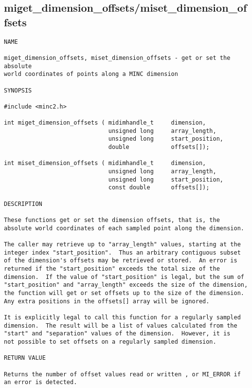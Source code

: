 \documentclass{article}
\begin{document}
\subsection{miget\_dimension\_offsets/miset\_dimension\_offsets}
\begin{verbatim}
NAME

miget_dimension_offsets, miset_dimension_offsets - get or set the absolute
world coordinates of points along a MINC dimension

SYNOPSIS

#include <minc2.h>

int miget_dimension_offsets ( midimhandle_t     dimension, 
                              unsigned long     array_length, 
                              unsigned long     start_position,
                              double            offsets[]);

int miset_dimension_offsets ( midimhandle_t     dimension, 
                              unsigned long     array_length, 
                              unsigned long     start_position,
                              const double      offsets[]);

DESCRIPTION

These functions get or set the dimension offsets, that is, the
absolute world coordinates of each sampled point along the dimension.

The caller may retrieve up to "array_length" values, starting at the
integer index "start_position".  Thus an arbitrary contiguous subset
of the dimension's offsets may be retrieved or stored.  An error is
returned if the "start_position" exceeds the total size of the
dimension.  If the value of "start_position" is legal, but the sum of
"start_position" and "array_length" exceeds the size of the dimension,
the function will get or set offsets up to the size of the dimension.
Any extra positions in the offsets[] array will be ignored.

It is explicitly legal to call this function for a regularly sampled
dimension.  The result will be a list of values calculated from the
"start" and "separation" values of the dimension.  However, it is 
not possible to set offsets on a regularly sampled dimension.

RETURN VALUE

Returns the number of offset values read or written , or MI_ERROR if
an error is detected.
\end{verbatim}
\end{document}
